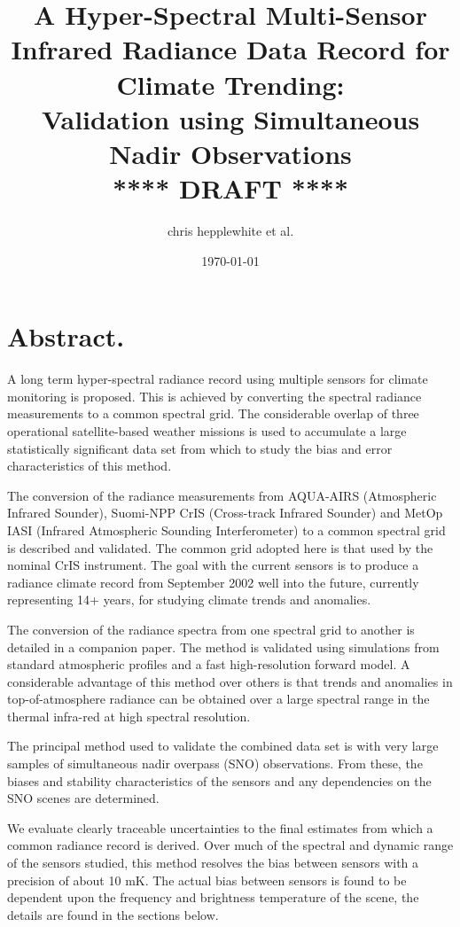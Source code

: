 \documentclass[11pt]{article}
\author{chris hepplewhite et al.}
\date{\today}
\title{A Hyper-Spectral Multi-Sensor Infrared Radiance Data Record for Climate Trending: \\  
  Validation using Simultaneous Nadir Observations \\  
  \vspace{3mm}
  {****} DRAFT {****}\\
}
\begin{document}
\maketitle

\tableofcontents

\section{Abstract.}
\label{sec:orgheadline1}

A long term hyper-spectral radiance record using multiple sensors for climate monitoring is proposed. This is achieved by converting the spectral radiance measurements to a common spectral grid. The considerable overlap of three operational satellite-based weather missions is used to accumulate a large statistically significant data set from which to study the bias and error characteristics of this method.

The conversion of the radiance measurements from AQUA-AIRS (Atmospheric Infrared Sounder), Suomi-NPP CrIS (Cross-track Infrared Sounder) and MetOp IASI (Infrared Atmospheric Sounding Interferometer) to a common spectral grid is described and validated. The common grid adopted here is that used by the nominal CrIS instrument. The goal with the current sensors is to produce a radiance climate record from September 2002 well into the future, currently representing 14+ years, for studying climate trends and anomalies.

The conversion of the radiance spectra from one spectral grid to another is detailed in a companion paper. The method is validated using simulations from standard atmospheric profiles and a fast high-resolution forward model. A considerable advantage of this method over others is that trends and anomalies in top-of-atmosphere radiance can be obtained over a large spectral range in the thermal infra-red at high spectral resolution.

The principal method used to validate the combined data set is with very large samples of simultaneous nadir overpass (SNO) observations. From these, the biases and stability characteristics of the sensors and any dependencies on the SNO scenes are determined.

We evaluate clearly traceable uncertainties to the final estimates from which a common radiance record is derived. Over much of the spectral and dynamic range of the sensors studied, this method resolves the bias between sensors with a precision of about 10 mK. The actual bias between sensors is found to be dependent upon the frequency and brightness temperature of the scene, the details are found in the sections below.
\end{document}
